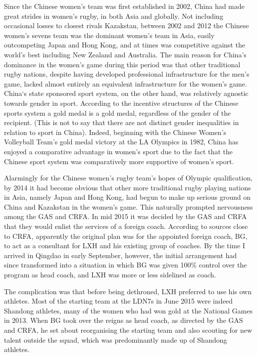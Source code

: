 Since the Chinese women's team was first established in 2002, China had made great strides in women's rugby, in both Asia and globally.  Not including occasional losses to closest rivals Kazakstan, between 2002 and 2012 the Chinese women's sevens team was the dominant women's team in Asia, easily outcompeting Japan and Hong Kong, and at times was competitive against the world's best including New Zealand and Australia.  The main reason for China's dominance in the women's game during this period was that other traditional rugby nations, despite having developed professional infrastructure for the men's game, lacked almost entirely an equivalent infrastructure for the women's game. China`s state sponsored sport system, on the other hand, was relatively agnostic towards gender in sport. According to the incentive structures of the Chinese sports system a gold medal is a gold medal, regardless of the gender of the recipient. (This is not to say that there are not distinct gender inequalities in relation to sport in China).
Indeed, beginning with the Chinese Women's Volleyball Team's gold medal victory at the LA Olympics in 1982, China has enjoyed a comparative advantage in women's sport due to the fact that the Chinese sport system was comparatively more supportive of women's sport.

Alarmingly for the Chinese women's rugby team's hopes of Olympic qualification, by 2014 it had become obvious that other more traditional rugby playing nations in Asia, namely Japan and Hong Kong, had begun to make up serious ground on China and Kazakstan in the women's game.  This naturally prompted nervousness among the GAS and CRFA.  In mid 2015 it was decided by the GAS and CRFA that they would enlist the services of a foreign coach.  According to sources close to CRFA, apparently the original plan was for the appointed foreign coach, BG, to act as a consultant for LXH and his existing group of coaches.  By the time I arrived in Qingdao in early September, however, the initial arrangement had since transformed into a situation in which BG was given 100\% control over the program as head coach, and LXH was more or less sidelined as coach.

The complication was that before being dethroned, LXH preferred to use his own athletes.  Most of the starting team at the LDN7s in June 2015 were indeed Shandong athletes, many of the women who had won gold at the National Games in 2013.  When BG took over the reigns as head coach, as directed by the GAS and CRFA, he set about reorganising the starting team and also scouting for new talent outside the squad, which was predominantly made up of Shandong athletes.

